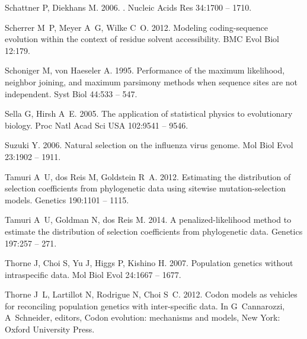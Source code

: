 \documentclass[11pt]{article}
\begin{document}
\begin{thebibliography}{79}
Schattner P, Diekhans M. 2006.
.
\newblock Nucleic Acids Res 34:1700 -- 1710.

Scherrer M~P, Meyer A~G, Wilke C~O. 2012.
\newblock Modeling coding-sequence evolution within the context of residue
  solvent accessibility.
\newblock BMC Evol Biol 12:179.

Schoniger M, {von Haeseler} A. 1995.
\newblock Performance of the maximum likelihood, neighbor joining, and maximum
  parsimony methods when sequence sites are not independent.
\newblock Syst Biol 44:533 -- 547.

Sella G, Hirsh A~E. 2005.
\newblock The application of statistical physics to evolutionary biology.
\newblock Proc Natl Acad Sci USA 102:9541 -- 9546.

Suzuki Y. 2006.
\newblock Natural selection on the influenza virus genome.
\newblock Mol Biol Evol 23:1902 -- 1911.

Tamuri A~U, {dos Reis} M, Goldstein R~A. 2012.
\newblock Estimating the distribution of selection coefficients from
  phylogenetic data using sitewise mutation-selection models.
\newblock Genetics 190:1101 -- 1115.

Tamuri A~U, Goldman N, {dos Reis} M. 2014.
\newblock A penalized-likelihood method to estimate the distribution of
  selection coefficients from phylogenetic data.
\newblock Genetics 197:257 -- 271.

Thorne J, Choi S, Yu J, Higgs P, Kishino H. 2007.
\newblock Population genetics without intraspecific data.
\newblock Mol Biol Evol 24:1667 -- 1677.

Thorne J~L, Lartillot N, Rodrigue N, Choi S~C. 2012.
\newblock Codon models as vehicles for reconciling population genetics with
  inter-specific data.
\newblock In G~Cannarozzi, A~Schneider, editors, Codon evolution: mechanisms
  and models, {New York}: {Oxford University Press}.


\end{thebibliography}
\end{document}
